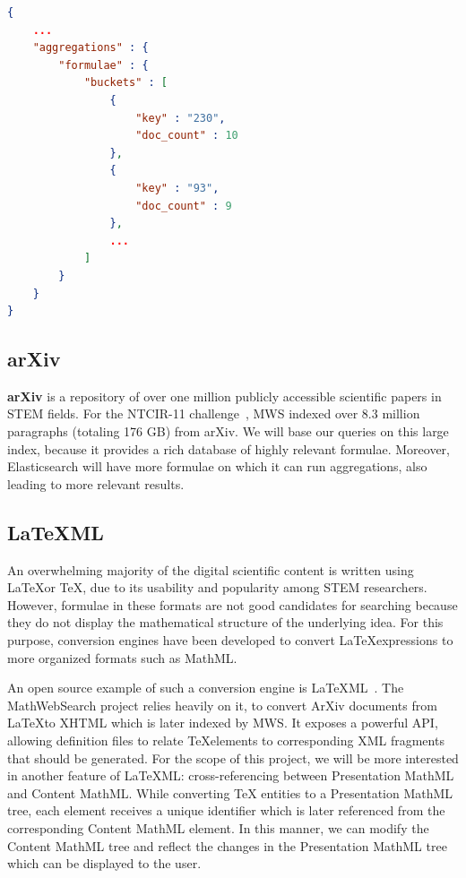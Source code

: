 \documentclass[a4paper,11pt,oneside]{article}
\def\MWS{\textsf{MWS}\xspace}
\def\mws{\textsf{MathWebSearch}\xspace}
\def\cmml{\textsf{Content MathML}\xspace}
\def\pmml{\textsf{Presentation MathML}\xspace}
\def\arxiv{\textsf{ArXiv}\xspace}
\def\latexml{\LaTeX{ML}\xspace}
\def\mathml{\textsf{MathML}\xspace}
\def\latex{\LaTeX}
\def\tex{\TeX}
\begin{document}
\begin{lstlisting}[language=json,firstnumber=1,caption=Elastic Search Term
Aggregation Response, captionpos=b, label=lst:es_agg_resp]
{
    ...
    "aggregations" : {
        "formulae" : {
            "buckets" : [
                {
                    "key" : "230",
                    "doc_count" : 10
                },
                {
                    "key" : "93",
                    "doc_count" : 9
                },
                ...
            ]
        }
    }
}
\end{lstlisting}

\subsection{arXiv}\label{subsec:arxiv}
\textbf{arXiv} is a repository of over one million publicly accessible
scientific papers in STEM fields. For the NTCIR-11
challenge~\cite{HamKohPro:man14},
MWS indexed over 8.3 million paragraphs (totaling 176 GB) from arXiv. We will
base our queries on this large index, because it provides a rich database of
highly relevant formulae. Moreover, Elasticsearch will have more formulae on
which it can run aggregations, also leading to more relevant results.

\subsection{\latexml}\label{subsec:latexml}
An overwhelming majority of the digital scientific content is written using
\latex or \tex, due to its usability and popularity among STEM researchers.
However, formulae in these formats are not good candidates for searching
because they do not display the mathematical structure of the underlying
idea. For this purpose, conversion engines have been developed to convert
\latex expressions to more organized formats such as \mathml.

An open source example of such a conversion engine is
\latexml~\cite{Miller:latexml:online}. The \mws project relies heavily on it,
to convert \arxiv documents from \latex to XHTML which is later indexed by \MWS.
It exposes a powerful API, allowing definition files to relate \tex elements to
corresponding XML fragments that should be generated.
For the scope of this project, we will be more interested in another feature of
\latexml: cross-referencing between \pmml and \cmml. While converting \tex
entities to a \pmml tree, each element receives a unique identifier which is
later referenced from the corresponding \cmml element. In this manner, we can
modify the \cmml tree and reflect the changes in the \pmml tree which can be
displayed to the user.
\end{document}
